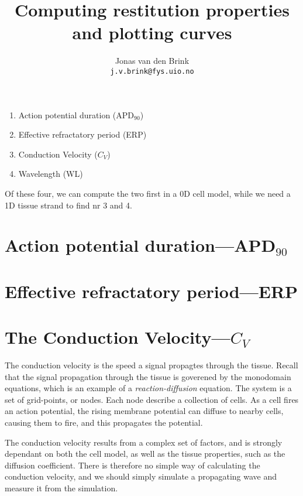 \documentclass[a4paper, 11pt, notitlepage, english]{article}
\title{Computing restitution properties and plotting curves}
\author{Jonas van den Brink \\ \texttt{j.v.brink@fys.uio.no}}
\begin{document}
\maketitle

\begin{enumerate}
  \item Action potential duration (APD$_{90}$)
  \item Effective refractatory period (ERP)
  \item Conduction Velocity ($C_V$)
  \item Wavelength (WL)
\end{enumerate}

Of these four, we can compute the two first in a 0D cell model, while we need a 1D tissue strand to find nr 3 and 4.

\clearpage

\section*{Action potential duration---APD$_{90}$}

\clearpage

\section*{Effective refractatory period---ERP}


\clearpage


\section*{The Conduction Velocity---$C_V$}

The conduction velocity is the speed a signal propagtes through the tissue. Recall that the signal propagation through the tissue is goverened by the monodomain equations, which is an example of a \emph{reaction-diffusion} equation. The system is a set of grid-points, or nodes. Each node describe a collection of cells. As a cell fires an action potential, the rising membrane potential can diffuse to nearby cells, causing them to fire, and this propagates the potential.

The conduction velocity results from a complex set of factors, and is strongly dependant on both the cell model, as well as the tissue properties, such as the diffusion coefficient. There is therefore no simple way of calculating the conduction velocity, and we should simply simulate a propagating wave and measure it from the simulation.
\end{document}
